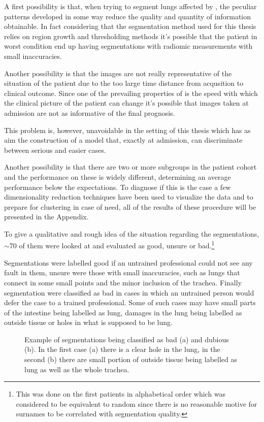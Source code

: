 A first possibility is that, when trying to segment lungs affected by \covid, the peculiar patterns developed in some way reduce the quality and quantity of information obtainable.
In fact considering that the segmentation method used for this thesis relies on region growth and thresholding methods it's possible that the patient in worst condition end up having segmentations with radiomic measurements with small inaccuracies.

Another possibility is that the images are not really representative of the situation of the patient due to the too large time distance from acqusition to clinical outcome. 
Since one of the prevailing properties of \covid is the speed with which the clinical picture of the patient can change it's possible that images taken at admission are not as informative of the final prognosis. 

This problem is, however, unavoidable in the setting of this thesis which has as aim the construction of a model that, exactly at admission, can discriminate between serious and easier cases.

Another possibility is that there are two or more subgroups in the patient cohort and the performance on these is widely different, determining an average performance below the expectations.
To diagnose if this is the case a few dimensionality reduction techniques have been used to visualize the data and to prepare for clustering in case of need, all of the results of these procedure will be presented in the Appendix.

To give a qualitative and rough idea of the situation regarding the segmentations, $\sim$70 of them were looked at and evaluated as good, unsure or bad.\footnote{This was done on the first patients in alphabetical order which was considered to be equivalent to random since there is no reasonable motive for surnames to be correlated with segmentation quality.}

Segmentations were labelled good if an untrained professional could not see any fault in them, unsure were those with small inaccuracies, such as lungs that connect in some small points and the minor inclusion of the trachea. 
Finally segmentation were classified as bad in cases in which an untrained person would defer the case to a trained professional. Some of such cases may have small parts of the intestine being labelled as lung, damages in the lung being labelled as outside tissue or holes in what is supposed to be lung.

\begin{figure}[H]
\centering
	\newline
        \caption{Example of segmentations being classified as bad (a) and dubious (b). In the first case (a) there is a clear hole in the lung, in the second (b) there are small portion of outside tissue being labelled as lung as well as the whole trachea.}\label{fig:ExampleSeg}
\end{figure}

